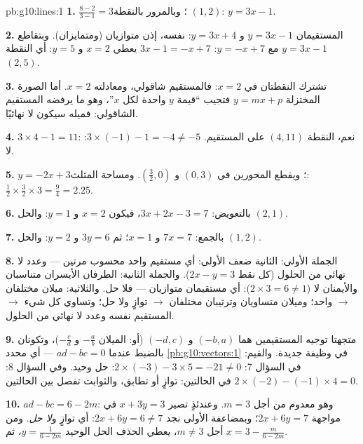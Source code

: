 \begin{solution}{pb:g10:lines:1}
\textbf{1.}  $\frac{8 - 2}{3 - 1} = 3$؛ وبالمرور بالنقطة $(1, 2)$:
$y = 3x - 1$.

\textbf{2.} المستقيمان $y = 3x - 1$ و $y = 3x + 4$:  نفسه، إذن متوازيان
(ومتمايزان). وبتقاطع $y = 3x - 1$ مع $y = -x + 7$:
$3x - 1 = -x + 7$ يعطي $x = 2$ و $y = 5$: أي النقطة $(2, 5)$.

\textbf{3.} تشترك النقطتان في $x = 2$: فالمستقيم شاقولي،
ومعادلته $x = 2$. أما الصورة المختزلة $y = mx + p$ فتجيب ``قيمة $y$
واحدة لكل $x$''، وهو ما يرفضه المستقيم الشاقولي: فميله
سيكون لا نهائيًا.

\textbf{4.} $3 \times 4 - 1 = 11$: نعم، النقطة $(4, 11)$ على
المستقيم. $3 \times (-1) - 1 = -4 \neq -5$: لا.

\textbf{5.} $y = -2x + 3$؛ ويقطع المحورين في $(0, 3)$ و
$\left(\frac32, 0\right)$. ومساحة المثلث:
$\frac12 \times \frac32 \times 3 = \frac94 = 2.25$.

\textbf{6.} بالتعويض: $3x + 2x - 3 = 7$، فيكون $x = 2$ و
$y = 1$: والحل $(2, 1)$.

\textbf{7.} بالجمع: $7x = 7$ و $x = 1$؛ ثم $3y = 6$ و $y = 2$:
والحل $(1, 2)$.

\textbf{8.} الجملة الأولى:  الثانية ضعف
الأولى: أي مستقيم واحد محسوب مرتين --- وعدد لا نهائي من الحلول
(كل نقط $2x - y = 3$). والجملة الثانية: الطرفان الأيسران
متناسبان والأيمنان لا ($2 \times 3 = 6 \neq 1$): أي مستقيمان
متوازيان --- فلا حل. والثلاثية: ميلان مختلفان
$\to$  واحد؛ وميلان متساويان وترتيبان مختلفان $\to$
توازٍ ولا حل؛ وتساوي كل شيء $\to$ المستقيم نفسه وعدد لا نهائي
من الحلول.

\textbf{9.} متجهتا توجيه المستقيمين هما $(-b, a)$ و
$(-d, c)$ (أو: الميلان $-\frac ab$ و $-\frac cd$)، وتكونان 
بالضبط عندما $ad - bc = 0$ --- أي محدد
\cref{pb:g10:vectors:1} في وظيفة جديدة. والقيم: في السؤال 7:
$2 \times (-3) - 3 \times 5 = -21 \neq 0$: حل وحيد.
وفي السؤال 8: $2 \times (-2) - (-1) \times 4 = 0$ في الحالتين:
توازٍ أو تطابق، والثوابت تفصل بين
الحالتين.

\textbf{10.} $ad - bc = 6 - 2m$: وهو معدوم من أجل $m = 3$. وعندئذٍ
تصير $x + 3y = 3$ في مواجهة $2x + 6y = 7$؛ وبمضاعفة الأولى نجد
$2x + 6y = 6 \neq 7$: أي توازٍ و\emph{لا حل}. ومن أجل
$m \neq 3$، يعطي الحذف الحل الوحيد
$y = \frac{1}{6 - 2m}$، ثم $x = 3 - \frac{m}{6 - 2m}$.


\end{solution}
